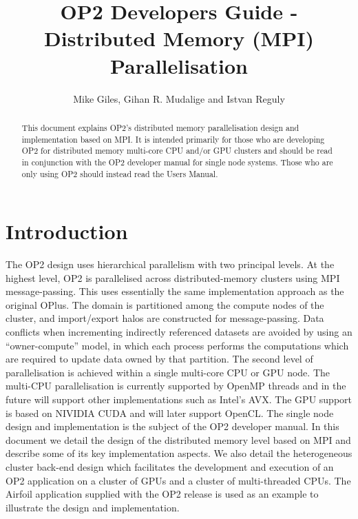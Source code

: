 \documentclass[11pt]{article}
\begin{document}
\title{OP2 Developers Guide - Distributed Memory (MPI) Parallelisation}
\author{Mike Giles, Gihan R. Mudalige and Istvan Reguly}

\maketitle

\begin{abstract}
\noindent This document explains OP2's distributed memory parallelisation design and implementation based on MPI.  It is
intended primarily for those who are developing OP2 for distributed memory multi-core CPU and/or GPU clusters and
should be read in conjunction with the OP2 developer manual for single node systems. Those who are only using OP2 should
instead read the Users Manual.
\end{abstract}

\newpage




\tableofcontents

\newpage

\section{Introduction}
The OP2 design uses hierarchical parallelism with two principal levels. At the highest level, OP2 is parallelised across
distributed-memory clusters using MPI message-passing.  This uses essentially the same implementation approach as the
original OPlus. The domain is partitioned among the compute nodes of the cluster, and import/export halos are
constructed for message-passing. Data conflicts when  incrementing indirectly referenced datasets are avoided by
using an ``owner-compute'' model, in which each process performs the computations which are required to update data
owned by that partition. The second level of parallelisation is achieved within a single multi-core CPU or
GPU node. The multi-CPU parallelisation is currently supported by OpenMP threads and in the future will support other
implementations such as Intel's AVX. The GPU support is based on NIVIDIA CUDA and will later support OpenCL. The single
node design and implementation is the subject of the OP2 developer manual. In this document we detail the design of the
distributed memory level based on MPI and describe some of its key implementation aspects. We also detail the
heterogeneous cluster back-end design which facilitates the development and execution of an OP2 application on a cluster
of GPUs and a cluster of multi-threaded CPUs. The Airfoil application supplied with the OP2 release is used as an
example to illustrate the design and implementation.
\end{document}
